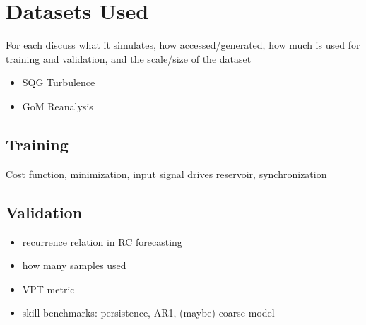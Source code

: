 
\section{Datasets Used}
\label{sec:datasets}

For each discuss what it simulates, how accessed/generated, how much is used for
training and validation, and the scale/size of the dataset
\begin{itemize}
    \item SQG Turbulence
    \item GoM Reanalysis
\end{itemize}

\subsection{Training}
\label{subsec:training}

Cost function, minimization, input signal drives reservoir, synchronization

\subsection{Validation}
\label{subsec:validation}

\begin{itemize}
    \item recurrence relation in RC forecasting
    \item how many samples used
    \item VPT metric
    \item skill benchmarks: persistence, AR1, (maybe) coarse model
\end{itemize}
